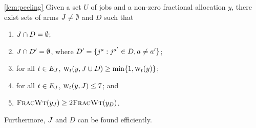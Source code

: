 \begin{numberedlemma}{\ref{lem:peeling}}
    Given a set $U$ of jobs and a non-zero fractional allocation $y$,
    there exist sets of arms $J \ne \emptyset$ and $D$ such that 
    \begin{enumerate}[label=\roman*.]
        \item $J \cap D = \emptyset$;
        \item $J \cap D' = \emptyset$, where $D' = \{{{j}^a} : j^{a'}
            \in D, a\ne a'\}$;
        \item for all $t \in E_J$, $\textsc{w}_{t}(y, J \cup D)\ge
          \min\{1, \textsc{w}_{t}(y)\}$; \label{item:lowerbound}
        \item for all $t \in E_J$, $\textsc{w}_{t}(y, J) \le 7$; and
            \label{item:upperbound}
        \item ${\normalfont\textsc{FracWt}}(y_J) \ge 2 {\normalfont\textsc{FracWt}}(y_D)$.
    \end{enumerate}
    Furthermore, $J$ and $D$ can be found efficiently.
\end{numberedlemma}

